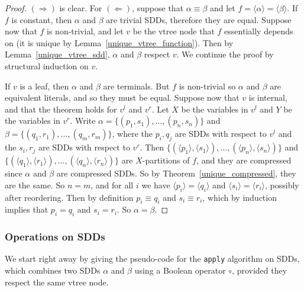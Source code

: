 \documentclass[11pt]{report}
\begin{document}
\begin{proof}
$(\Rightarrow)$ is clear. For $(\Leftarrow)$, suppose that $\alpha \equiv \beta$ and let $f = \langle \alpha \rangle = \langle \beta \rangle.$ If $f$ is constant, then $\alpha$ and $\beta$ are trivial SDDs, therefore they are equal.
Suppose  now that $f$ is non-trivial, and let $v$ be the vtree node that $f$ essentially depends on (it is unique by Lemma~\ref{unique_vtree_function}). Then by Lemma~\ref{unique_vtree_sdd}, $\alpha$ and $\beta$ respect $v$. 
We continue the proof by structural induction on $v$. 

If $v$ is a leaf, then $\alpha$ and $\beta$ are terminals. But $f$ is non-trivial so $\alpha$ and $\beta$ are equivalent literals, and so they must be equal. 
Suppose now that $v$ is internal, and that the theorem holds for $v^l$ and $v^r$. Let $X$ be the variables in $v^l$ and $Y$ be the variables in $v^r$. 
Write $\alpha = \{(p_1,s_1), ..., (p_n,s_n)\}$  and $\beta = \{(q_1,r_1), ..., (q_m,r_m)\}$, where the $p_i, q_j$ are SDDs with respect to $v^l$ and the $s_i, r_j$ are SDDs with respect to $v^r$. Then  $\{(\langle p_1 \rangle,\langle s_1\rangle), ..., (\langle p_n\rangle,\langle s_n\rangle)\}$ and  $\{(\langle q_1 \rangle,\langle r_1\rangle), ..., (\langle q_n\rangle,\langle r_n\rangle)\}$ are $X$-partitions of $f$, and they are compressed since $\alpha$ and $\beta$ are compressed SDDs. So by Theorem~\ref{unique_compressed}, they are the same. So $n = m$, and for all $i$ we have $\langle p_i\rangle = \langle q_i \rangle $ and $\langle s_i \rangle = \langle r_i\rangle$, possibly after reordering. Then by definition $p_i \equiv q_i$ and $s_i \equiv r_i$, which by induction implies that $p_i = q_i$ and $s_i = r_i$. So $\alpha = \beta$.
\end{proof}

\subsubsection{Operations on SDDs} 

We start right away by giving the pseudo-code for the \texttt{apply} algorithm on SDDs, which combines two SDDs $\alpha$ and $\beta$ using a Boolean operator $\circ$, provided they respect the same vtree node.
\end{document}
